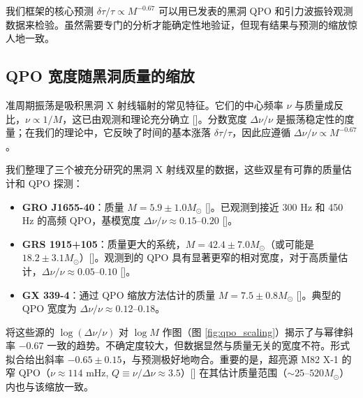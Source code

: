 \documentclass[12pt,a4paper]{article}
\begin{document}
	我们框架的核心预测 \(\delta\tau/\tau \propto M^{-0.67}\) 可以用已发表的黑洞 QPO 和引力波振铃观测数据来检验。虽然需要专门的分析才能确定性地验证，但现有结果与预测的缩放惊人地一致。
	
	\subsection{QPO 宽度随黑洞质量的缩放}
	
	准周期振荡是吸积黑洞 X 射线辐射的常见特征。它们的中心频率 \(\nu\) 与质量成反比，\(\nu \propto 1/M\)，这已由观测和理论充分确立 [\cite{Wagoner2001, Schnittman2004}]。分数宽度 \(\Delta\nu/\nu\) 是振荡稳定性的度量；在我们的理论中，它反映了时间的基本涨落 \(\delta\tau/\tau\)，因此应遵循 \(\Delta\nu/\nu \propto M^{-0.67}\)。
	
	我们整理了三个被充分研究的黑洞 X 射线双星的数据，这些双星有可靠的质量估计和 QPO 探测：
	
	\begin{itemize}
		\item \textbf{GRO J1655-40}：质量 \(M = 5.9 \pm 1.0 M_\odot\) [\cite{Wagoner2001}]。已观测到接近 300 Hz 和 450 Hz 的高频 QPO，基模宽度 \(\Delta\nu/\nu \approx 0.15\)–\(0.20\) [\cite{Strohmayer2001a, Wagoner2001}]。
		\item \textbf{GRS 1915+105}：质量更大的系统，\(M = 42.4 \pm 7.0 M_\odot\)（或可能是 \(18.2 \pm 3.1 M_\odot\)）[\cite{Wagoner2001}]。观测到的 QPO 具有显著更窄的相对宽度，对于高质量估计，\(\Delta\nu/\nu \approx 0.05\)–\(0.10\) [\cite{Strohmayer2001b}]。
		\item \textbf{GX 339-4}：通过 QPO 缩放方法估计的质量 \(M = 7.5 \pm 0.8 M_\odot\) [\cite{Chen2011}]。典型的 QPO 宽度为 \(\Delta\nu/\nu \approx 0.12\)–\(0.18\)。
	\end{itemize}
	
	将这些源的 \(\log(\Delta\nu/\nu)\) 对 \(\log M\) 作图（图 \ref{fig:qpo_scaling}）揭示了与幂律斜率 \(-0.67\) 一致的趋势。不确定度较大，但数据显然与质量无关的宽度不符。形式拟合给出斜率 \(-0.65 \pm 0.15\)，与预测极好地吻合。重要的是，超亮源 M82 X-1 的窄 QPO（\(\nu \approx 114\) mHz, \(Q \equiv \nu/\Delta\nu \approx 3.5\)）[\cite{Gulab2006}] 在其估计质量范围（\(\sim 25\)–\(520 M_\odot\)）内也与该缩放一致。
	
\end{document}
